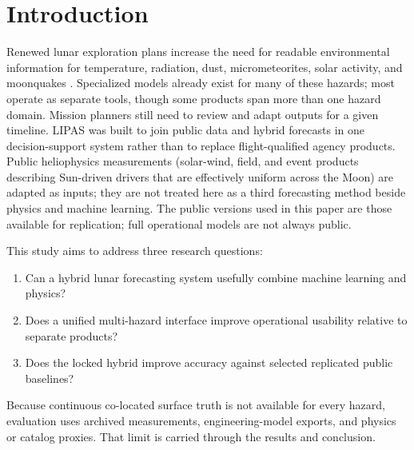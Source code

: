 \section{Introduction}
\label{sec:intro}

Renewed lunar exploration plans increase the need for readable environmental information for temperature, radiation, dust, micrometeorites, solar activity, and moonquakes \citep{nasa2020artemis}. Specialized models already exist for many of these hazards; most operate as separate tools, though some products span more than one hazard domain. Mission planners still need to review and adapt outputs for a given timeline. LIPAS was built to join public data and hybrid forecasts in one decision-support system rather than to replace flight-qualified agency products. Public heliophysics measurements (solar-wind, field, and event products describing Sun-driven drivers that are effectively uniform across the Moon) are adapted as inputs; they are not treated here as a third forecasting method beside physics and machine learning. The public versions used in this paper are those available for replication; full operational models are not always public.

This study aims to address three research questions:
\begin{enumerate}[leftmargin=*,itemsep=0.2em]
\item[\textbf{RQ1}] Can a hybrid lunar forecasting system usefully combine machine learning and physics?
\item[\textbf{RQ2}] Does a unified multi-hazard interface improve operational usability relative to separate products?
\item[\textbf{RQ3}] Does the locked hybrid improve accuracy against selected replicated public baselines?
\end{enumerate}

Because continuous co-located surface truth is not available for every hazard, evaluation uses archived measurements, engineering-model exports, and physics or catalog proxies. That limit is carried through the results and conclusion.
